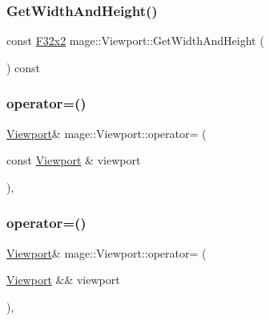 \hypertarget{classmage_1_1_viewport_a334f6fe7e86069e0ac14b71ebc543307}{}\label{classmage_1_1_viewport_a334f6fe7e86069e0ac14b71ebc543307} 
\subsubsection{\texorpdfstring{Get\+Width\+And\+Height()}{GetWidthAndHeight()}}
{\footnotesize\ttfamily const \hyperlink{namespacemage_aa87237ad091f5cd7da612b8523fc108f}{F32x2} mage\+::\+Viewport\+::\+Get\+Width\+And\+Height (\begin{DoxyParamCaption}{ }\end{DoxyParamCaption}) const\hspace{0.3cm}{\ttfamily [noexcept]}}

\hypertarget{classmage_1_1_viewport_a4861a25cdb8baf2e0a589ac3b4a2f4cf}{}\label{classmage_1_1_viewport_a4861a25cdb8baf2e0a589ac3b4a2f4cf} 
\subsubsection{\texorpdfstring{operator=()}{operator=()}\hspace{0.1cm}{\footnotesize\ttfamily [1/2]}}
{\footnotesize\ttfamily \hyperlink{classmage_1_1_viewport}{Viewport}\& mage\+::\+Viewport\+::operator= (\begin{DoxyParamCaption}\item[{const \hyperlink{classmage_1_1_viewport}{Viewport} \&}]{viewport }\end{DoxyParamCaption})\hspace{0.3cm}{\ttfamily [default]}, {\ttfamily [noexcept]}}

\hypertarget{classmage_1_1_viewport_aa5bc8241e9a0669f2a5fdf96405f769a}{}\label{classmage_1_1_viewport_aa5bc8241e9a0669f2a5fdf96405f769a} 
\subsubsection{\texorpdfstring{operator=()}{operator=()}\hspace{0.1cm}{\footnotesize\ttfamily [2/2]}}
{\footnotesize\ttfamily \hyperlink{classmage_1_1_viewport}{Viewport}\& mage\+::\+Viewport\+::operator= (\begin{DoxyParamCaption}\item[{\hyperlink{classmage_1_1_viewport}{Viewport} \&\&}]{viewport }\end{DoxyParamCaption})\hspace{0.3cm}{\ttfamily [default]}, {\ttfamily [noexcept]}}

